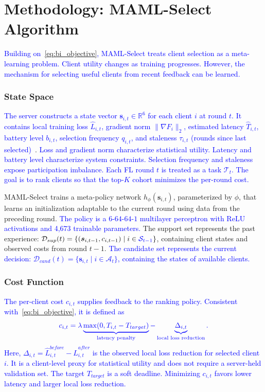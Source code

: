 \documentclass[journal]{IEEEtran}
\newcommand{\revision}[1]{\textcolor{blue}{#1}}
\begin{document}
\section{Methodology: MAML-Select Algorithm}
\revision{Building on~\eqref{eq:bi_objective}, MAML-Select treats client selection as a meta-learning problem. Client utility changes as training progresses. However, the mechanism for selecting useful clients from recent feedback can be learned.}

\subsubsection{State Space}
\revision{The server constructs a state vector $\bm{s}_{i,t} \in \mathbb{R}^6$ for each client $i$ at round $t$. It contains local training loss $\hat{L}_{i,t}$, gradient norm $\|\nabla F_i\|_2$, estimated latency $\hat{T}_{i,t}$, battery level $b_{i,t}$, selection frequency $q_{i,t}$, and staleness $\tau_{i,t}$ (rounds since last selected)}~\cite{pan2024contextual,xu2024federated}. \revision{Loss and gradient norm characterize statistical utility. Latency and battery level characterize system constraints. Selection frequency and staleness expose participation imbalance. Each FL round $t$ is treated as a task $\mathcal{T}_t$. The goal is to rank clients so that the top-$K$ cohort minimizes the per-round cost.}

MAML-Select trains a meta-policy network $h_\phi(\bm{s}_{i,t})$, parameterized by $\phi$, that learns an initialization adaptable to the current round using data from the preceding round. \revision{The policy is a $6$-$64$-$64$-$1$ multilayer perceptron with ReLU activations and 4,673 trainable parameters.} The support set represents the past experience: $\mathcal{D}_{sup}(t) = \{(\bm{s}_{i,t-1}, c_{i,t-1}) \mid i \in \revision{\mathcal{S}_{t-1}}\}$, containing client states and observed costs from round $t-1$. \revision{The candidate set represents the current decision: $\mathcal{D}_{cand}(t) = \{\bm{s}_{i,t} \mid i \in \mathcal{A}_t\}$, containing the states of available clients.}

\subsubsection{Cost Function}
\revision{The per-client cost $c_{i,t}$ supplies feedback to the ranking policy. Consistent with~\eqref{eq:bi_objective}, it is defined as}
\begin{equation}
	\color{blue}
	c_{i,t} = \lambda \underbrace{\max(0, T_{i,t} - T_{target})}_{\text{latency penalty}} - \underbrace{\Delta_{i,t}}_{\text{local loss reduction}}.
	\label{eq:cost}
\end{equation}
\revision{Here, $\Delta_{i,t}=\hat{L}_{i,t}^{before}-\hat{L}_{i,t}^{after}$ is the observed local loss reduction for selected client $i$. It is a client-level proxy for statistical utility and does not require a server-held validation set. The target $T_{target}$ is a soft deadline. Minimizing $c_{i,t}$ favors lower latency and larger local loss reduction.}
\end{document}
